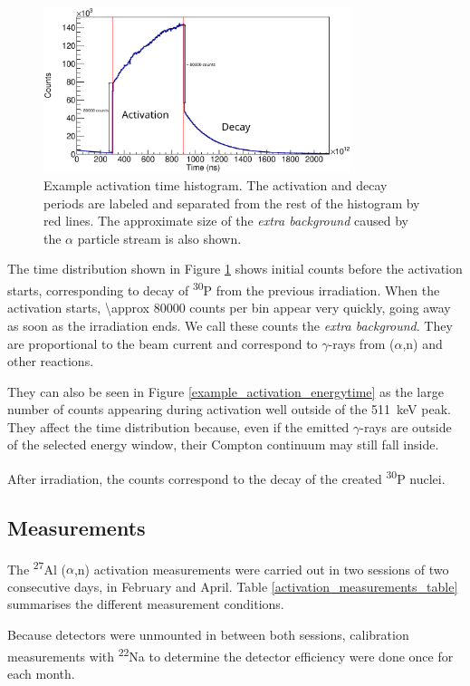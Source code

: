 \documentclass[a4paper,12pt]{report}
\newcommand{\an}{($\alpha$,n) }
\newcommand{\Aliso}{\textsuperscript{27}Al }
\newcommand{\Piso}{\textsuperscript{30}P }
\newcommand{\Na}{\textsuperscript{22}Na }
\begin{document}
\begin{figure}[H]
	\centering
	\includegraphics[width=0.80\textwidth]{example_activation_time_histogram.eps}
	\caption{Example activation time histogram.
	The activation and decay periods are labeled and separated from the rest of the histogram by red lines.
	The approximate size of the \textit{extra background} caused by the $\alpha$ particle stream is also shown.}
	\label{example_activation_time_histogram}
\end{figure}

The time distribution shown in Figure \ref{example_activation_time_histogram} shows initial counts before the activation starts, corresponding to decay of \Piso from the previous irradiation.
When the activation starts, \num{\approx 80000} counts per bin appear very quickly, going away as soon as the irradiation ends.
We call these counts the \textit{extra background}.
They are proportional to the beam current and correspond to $\gamma$-rays from \an and other reactions.

They can also be seen in Figure \ref{example_activation_energytime} as the large number of counts appearing during activation well outside of the \qty{511}{\keV} peak.
They affect the time distribution because, even if the emitted $\gamma$-rays are outside of the selected energy window, their Compton continuum may still fall inside.

After irradiation, the counts correspond to the decay of the created \Piso nuclei.

\subsection{Measurements}
The \Aliso\an activation measurements were carried out in two sessions of two consecutive days, in February and April.
Table \ref{activation_measurements_table} summarises the different measurement conditions.

Because detectors were unmounted in between both sessions, calibration measurements with \Na to determine the detector efficiency were done once for each month.
\end{document}
